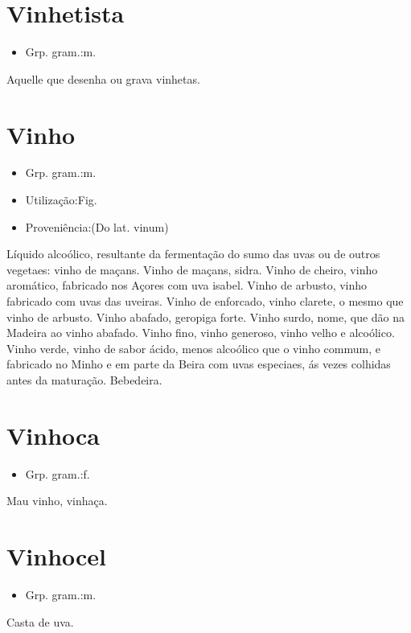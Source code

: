\documentclass{article}
\begin{document}
\section{Vinhetista}
\begin{itemize}
\item {Grp. gram.:m.}
\end{itemize}
Aquelle que desenha ou grava vinhetas.
\section{Vinho}
\begin{itemize}
\item {Grp. gram.:m.}
\end{itemize}
\begin{itemize}
\item {Utilização:Fig.}
\end{itemize}
\begin{itemize}
\item {Proveniência:(Do lat. \textunderscore vinum\textunderscore )}
\end{itemize}
Líquido alcoólico, resultante da fermentação do sumo das uvas ou de outros vegetaes: \textunderscore vinho de maçans\textunderscore .
\textunderscore Vinho de maçans\textunderscore , sidra.
\textunderscore Vinho de cheiro\textunderscore , vinho aromático, fabricado nos Açores com uva isabel.
\textunderscore Vinho de arbusto\textunderscore , vinho fabricado com uvas das uveiras.
\textunderscore Vinho de enforcado\textunderscore , vinho clarete, o mesmo que \textunderscore vinho de arbusto\textunderscore .
\textunderscore Vinho abafado\textunderscore , geropiga forte.
\textunderscore Vinho surdo\textunderscore , nome, que dão na Madeira ao vinho abafado.
\textunderscore Vinho fino\textunderscore , vinho generoso, vinho velho e alcoólico.
\textunderscore Vinho verde\textunderscore , vinho de sabor ácido, menos alcoólico que o vinho commum, e fabricado no Minho e em parte da Beira com uvas especiaes, ás vezes colhidas antes da maturação.
Bebedeira.
\section{Vinhoca}
\begin{itemize}
\item {Grp. gram.:f.}
\end{itemize}
Mau vinho, vinhaça.
\section{Vinhocel}
\begin{itemize}
\item {Grp. gram.:m.}
\end{itemize}
Casta de uva.
\end{document}

